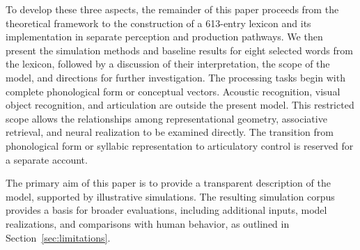 To develop these three aspects, the remainder of this paper proceeds from the theoretical framework to the construction of a 613-entry lexicon and its implementation in separate perception and production pathways. We then present the simulation methods and baseline results for eight selected words from the lexicon, followed by a discussion of their interpretation, the scope of the model, and directions for further investigation. The processing tasks begin with complete phonological form or conceptual vectors. Acoustic recognition, visual object recognition, and articulation are outside the present model. This restricted scope allows the relationships among representational geometry, associative retrieval, and neural realization to be examined directly. The transition from phonological form or syllabic representation to articulatory control is reserved for a separate account.

The primary aim of this paper is to provide a transparent description of the model, supported by illustrative simulations. The resulting simulation corpus provides a basis for broader evaluations, including additional inputs, model realizations, and comparisons with human behavior, as outlined in Section~\ref{sec:limitations}.
